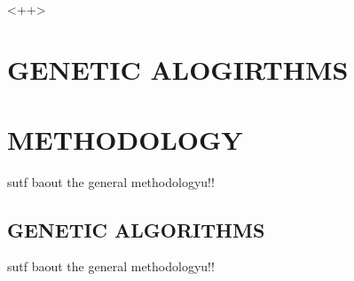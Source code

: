 \documentclass[10pt,twocolumn]{article}
\begin{document}
\paragraph{}<++>

\section{GENETIC ALOGIRTHMS}



\section{METHODOLOGY}
sutf baout the general methodologyu!!

\subsection{GENETIC ALGORITHMS}

sutf baout the general methodologyu!!
\end{document}
